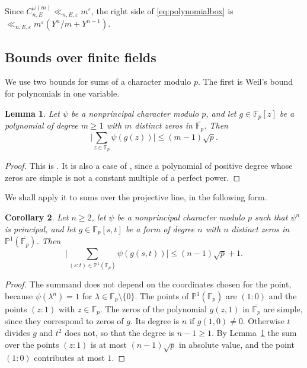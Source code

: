 \documentclass[11pt]{amsart}
\numberwithin{equation}{section}
\numberwithin{figure}{section}
\newtheorem{lemma}{Lemma}[section]
\newtheorem{corollary}[lemma]{Corollary}
\theoremstyle{definition}
\newcommand{\eps}{\varepsilon}
\newcommand{\Fp}{\mathbb F_p}
\newcommand{\PP}{\mathbb P}
\begin{document}
Since $C_{n,E}^{\omega(m)}\ll_{n,E,\eps}m^\eps$, the right side of
\eqref{eq:polynomialbox} is $\ll_{n,E,\eps}m^\eps(Y^n/m+Y^{n-1})$.

\subsection{Bounds over finite fields}\label{sec:finite-fields}

We use two bounds for sums of a character modulo $p$. The first is
Weil's bound for polynomials in one variable.

\begin{lemma}\label{lem:weil}
Let $\psi$ be a nonprincipal character modulo $p$, and let
$g\in\Fp[z]$ be a polynomial of degree $m\ge1$ with $m$ distinct
zeros in $\overline{\Fp}$. Then
\begin{equation}\label{eq:weil}
 \bigg|\sum_{z\in\Fp}\psi(g(z))\bigg|\le(m-1)\sqrt p.
\end{equation}
\end{lemma}

\begin{proof}
This is \cite[(1.2)]{K}. It is also a case of
\cite[Theorem~11.23]{IK}, since a polynomial of positive degree whose
zeros are simple is not a constant multiple of a perfect power.
\end{proof}

We shall apply it to sums over the projective line, in the following
form.

\begin{corollary}\label{cor:weilline}
Let $n\ge2$, let $\psi$ be a nonprincipal character modulo $p$ such
that $\psi^n$ is principal, and let $g\in\Fp[s,t]$ be a form of
degree $n$ with $n$ distinct zeros in $\PP^1(\overline{\Fp})$. Then
\begin{equation}\label{eq:weilline}
 \bigg|\sum_{(s:t)\in\PP^1(\Fp)}\psi(g(s,t))\bigg|\le(n-1)\sqrt p+1.
\end{equation}
\end{corollary}

\begin{proof}
The summand does not depend on the coordinates chosen for the point,
because $\psi(\lambda^n)=1$ for $\lambda\in\Fp\setminus\{0\}$. The
points of $\PP^1(\Fp)$ are $(1:0)$ and the points $(z:1)$ with
$z\in\Fp$. The zeros of the polynomial $g(z,1)$ in $\overline{\Fp}$
are simple, since they correspond to zeros of $g$. Its degree is $n$
if $g(1,0)\ne0$. Otherwise $t$ divides $g$ and $t^2$ does not, so
that the degree is $n-1\ge1$. By Lemma~\ref{lem:weil} the sum over
the points $(z:1)$ is at most $(n-1)\sqrt p$ in absolute value, and
the point $(1:0)$ contributes at most $1$.
\end{proof}
\end{document}
